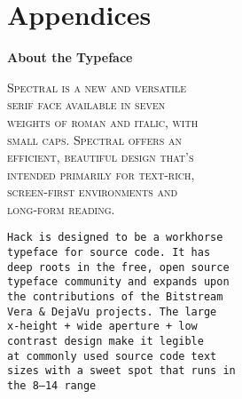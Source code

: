 

\appendix
\part*{Appendices}
{}


\newpage
\backmatter

\titleformat{\chapter}[hang]{\Large}{\filright\enspace\thechapter\enspace}{2.5cm}{\Large\bfseries\filcenter}
{}
\printbibliography


\clearpage
{}

\begin{center}
{\Large\textbf{About the Typeface}}

\entryskip

\begin{minipage}{0.5\textwidth}\small
\noindent\textsc{Spectral is a new and versatile \\ serif face available in seven \\ weights of roman and italic, with \\ small caps.
Spectral offers an \\ efficient, beautiful design that’s \\ intended primarily for text-rich, \\ screen-first environments and\\ long-form reading.}

\entryskip

\texttt{Hack is designed to be a workhorse \\ typeface for source code.
It has \\ deep roots in the free, open source \\ typeface community and expands upon \\ the contributions of the Bitstream \\ Vera \& DejaVu projects.
The large \\ x-height + wide aperture + low \\ contrast design make it legible \\ at commonly used source code text \\ sizes with a sweet spot that runs in \\ the 8--14 range}
\end{minipage}
\end{center}


